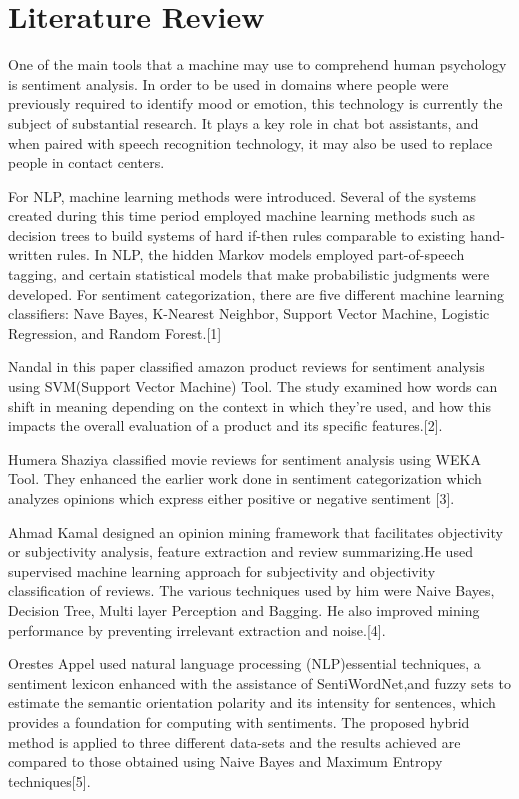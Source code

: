 \section{Literature Review}
One of the main tools that a machine may use to comprehend human psychology is sentiment analysis. In order to be used in domains where people were previously required to identify mood or emotion, this technology is currently the subject of substantial research. It plays a key role in chat bot assistants, and when paired with speech recognition technology, it may also be used to replace people in contact centers. 

\par For NLP, machine learning methods were introduced. Several of the systems created during this time period employed machine learning methods such as decision trees to build systems of hard if-then rules comparable to existing hand-written rules. In NLP, the hidden Markov models employed part-of-speech tagging, and certain statistical models that make probabilistic judgments were developed. For sentiment categorization, there are five different machine learning classifiers: Nave Bayes, K-Nearest Neighbor, Support Vector Machine, Logistic Regression, and Random Forest.[1]

Nandal in this paper classified amazon product reviews for sentiment analysis using SVM(Support Vector Machine) Tool. The study examined how words can shift in meaning depending on the context in which they're used, and how this impacts the overall evaluation of a product and its specific features.[2].

 \par Humera Shaziya classified movie reviews for sentiment analysis using WEKA Tool. They enhanced the earlier work done in sentiment categorization which analyzes opinions which express either positive or negative sentiment
[3].

Ahmad Kamal designed an opinion mining framework that facilitates objectivity or subjectivity analysis, feature extraction and review summarizing.He used supervised machine learning approach for subjectivity and objectivity classification of reviews. The various techniques used by him were Naive Bayes, Decision Tree, Multi layer Perception and Bagging. He also improved mining performance by preventing irrelevant extraction and noise.[4].\par

Orestes Appel used natural language processing (NLP)essential techniques, a sentiment lexicon enhanced with the assistance of SentiWordNet,and fuzzy sets to estimate the semantic orientation polarity and its intensity for sentences,
which provides a foundation for computing with sentiments. The proposed hybrid method is applied to three different data-sets and the results achieved are compared to those obtained
using Naive Bayes and Maximum Entropy techniques[5].
